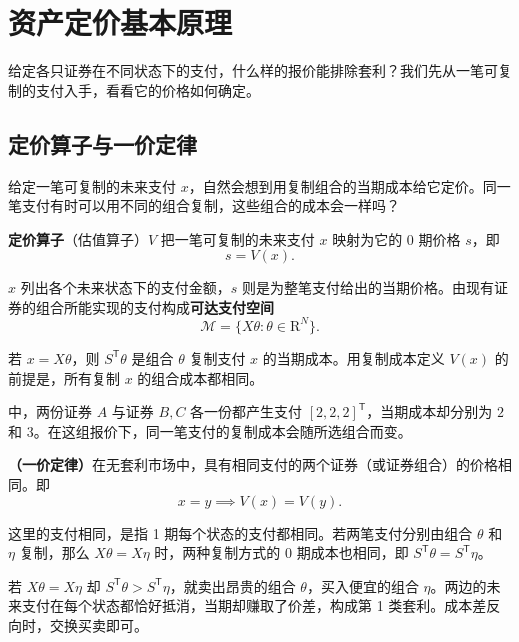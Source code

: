 \section{资产定价基本原理}\label{sec:wj-four-pricing}
给定各只证券在不同状态下的支付，什么样的报价能排除套利？我们先从一笔可复制的支付入手，看看它的价格如何确定。

\subsection{定价算子与一价定律}
给定一笔可复制的未来支付 $x$，自然会想到用复制组合的当期成本给它定价。同一笔支付有时可以用不同的组合复制，这些组合的成本会一样吗？

\begin{tcolorbox}[knowledge,title=定价算子]
\textbf{定价算子}（估值算子）$V$ 把一笔可复制的未来支付 $x$ 映射为它的 0 期价格 $s$，即
\begin{equation}
    s=V(x).
 \label{eq:wj-four-1}
\end{equation}
\end{tcolorbox}

$x$ 列出各个未来状态下的支付金额，$s$ 则是为整笔支付给出的当期价格。由现有证券的组合所能实现的支付构成\textbf{可达支付空间}
\[
 \mathcal M=\{X\theta:\theta\in\mathrm R^N\}.
\]

若 $x=X\theta$，则 $S^{\mathsf T}\theta$ 是组合 $\theta$ 复制支付 $x$ 的当期成本。用复制成本定义 $V(x)$ 的前提是，所有复制 $x$ 的组合成本都相同。

 中，两份证券 $A$ 与证券 $B,C$ 各一份都产生支付 $[2,2,2]^{\mathsf T}$，当期成本却分别为 $2$ 和 $3$。在这组报价下，同一笔支付的复制成本会随所选组合而变。

\begin{tcolorbox}[knowledge]
\textbf{（一价定律）}在无套利市场中，具有相同支付的两个证券（或证券组合）的价格相同。即
\begin{equation}
    x=y\implies V(x)=V(y).
 \label{eq:wj-four-2}
\end{equation}

这里的支付相同，是指 1 期每个状态的支付都相同。若两笔支付分别由组合 $\theta$ 和 $\eta$ 复制，那么 $X\theta=X\eta$ 时，两种复制方式的 0 期成本也相同，即 $S^{\mathsf T}\theta=S^{\mathsf T}\eta$。
\end{tcolorbox}

\begin{solution}[label-content={证明},blank-type=none]
若 $X\theta=X\eta$ 却 $S^{\mathsf T}\theta>S^{\mathsf T}\eta$，就卖出昂贵的组合 $\theta$，买入便宜的组合 $\eta$。两边的未来支付在每个状态都恰好抵消，当期却赚取了价差，构成第 1 类套利。成本差反向时，交换买卖即可。
\end{solution}

